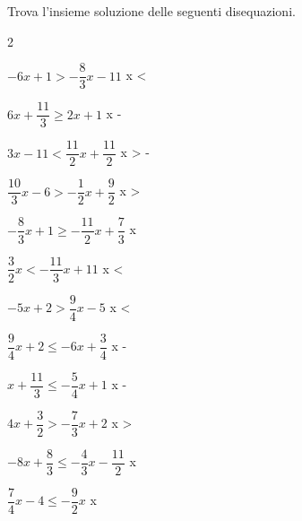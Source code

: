 \begin{esercizio}\label{ese:dis_13}
Trova l'insieme soluzione delle seguenti disequazioni.
\begin{htmulticols}{2}
\begin{enumeratea}
\item  \(-6 x +1 > -\dfrac{8}{3} x -11\) \sol 
{x < }
\item  \(6 x +\dfrac{11}{3} \geqslant 2 x +1\) \sol 
{x \geqslant -}
\item  \(3 x -11 < \dfrac{11}{2} x +\dfrac{11}{2}\) \sol 
{x > -}
\item  \(\dfrac{10}{3} x -6 > -\dfrac{1}{2} x +\dfrac{9}{2}\) \sol 
{x > }
\item  \(-\dfrac{8}{3} x +1 \geqslant -\dfrac{11}{2} x +\dfrac{7}{3}\) \sol 
{x \geqslant {}}
\item  \(\dfrac{3}{2} x  < -\dfrac{11}{3} x +11\) \sol 
{x < }
\item  \(-5 x +2 > \dfrac{9}{4} x -5\) \sol 
{x < }
\item  \(\dfrac{9}{4} x +2 \leqslant -6 x +\dfrac{3}{4}\) \sol 
{x \leqslant -}
\item  \(x +\dfrac{11}{3} \leqslant -\dfrac{5}{4} x +1\) \sol 
{x \leqslant -}
\item  \(4 x +\dfrac{3}{2} > -\dfrac{7}{3} x +2\) \sol 
{x > }
\item  \(-8 x +\dfrac{8}{3} \leqslant -\dfrac{4}{3} x -\dfrac{11}{2}\) \sol 
{x \geqslant {}}
\item  \(\dfrac{7}{4} x -4 \leqslant -\dfrac{9}{2} x \) \sol 
{x \leqslant {}}
\end{enumeratea}
\end{htmulticols}
\end{esercizio}


